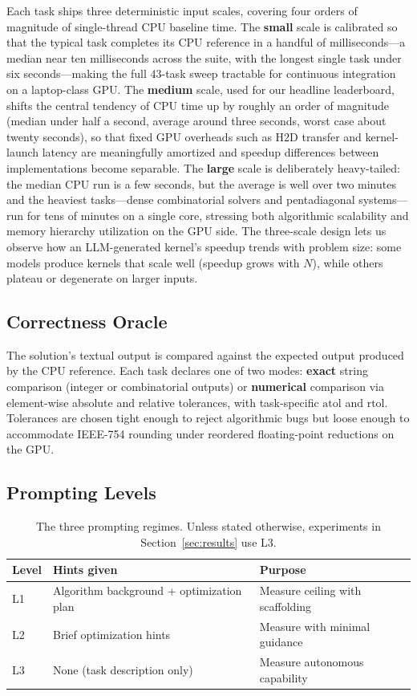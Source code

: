 \documentclass{article}
\begin{document}
Each task ships three deterministic input scales, covering four orders
of magnitude of single-thread CPU baseline time. The \textbf{small}
scale is calibrated so that the typical task completes its CPU reference
in a handful of milliseconds---a median near ten milliseconds across the
suite, with the longest single task under six seconds---making the full
43-task sweep tractable for continuous integration on a laptop-class
GPU. The \textbf{medium} scale, used for our headline leaderboard, shifts
the central tendency of CPU time up by roughly an order of magnitude
(median under half a second, average around three seconds, worst case
about twenty seconds), so that fixed GPU overheads such as H2D transfer
and kernel-launch latency are meaningfully amortized and speedup
differences between implementations become separable. The \textbf{large}
scale is deliberately heavy-tailed: the median CPU run is a few seconds,
but the average is well over two minutes and the heaviest tasks---dense
combinatorial solvers and pentadiagonal systems---run for tens of minutes
on a single core, stressing both algorithmic scalability and memory
hierarchy utilization on the GPU side. The three-scale design lets us
observe how an LLM-generated kernel's speedup trends with problem size:
some models produce kernels that scale well (speedup grows with $N$),
while others plateau or degenerate on larger inputs.

\subsection{Correctness Oracle}
The solution's textual output is compared against the expected output
produced by the CPU reference. Each task declares one of two modes:
\textbf{exact} string comparison (integer or combinatorial outputs) or
\textbf{numerical} comparison via element-wise absolute and relative
tolerances, with task-specific $\mathrm{atol}$ and $\mathrm{rtol}$.
Tolerances are chosen tight enough to reject algorithmic bugs but loose
enough to accommodate IEEE-754 rounding under reordered floating-point
reductions on the GPU.

\subsection{Prompting Levels}

\begin{table}[ht]
\centering
\small
\caption{The three prompting regimes. Unless stated otherwise, experiments in Section~\ref{sec:results} use L3.}
\label{tab:levels}
\begin{tabular}{@{}lll@{}}
\toprule
\textbf{Level} & \textbf{Hints given} & \textbf{Purpose} \\
\midrule
L1 & Algorithm background + optimization plan & Measure ceiling with scaffolding \\
L2 & Brief optimization hints & Measure with minimal guidance \\
L3 & None (task description only) & Measure autonomous capability \\
\bottomrule
\end{tabular}
\end{table}
\end{document}
